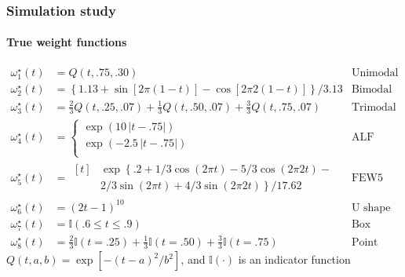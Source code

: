 \documentclass[handout]{snedecorbeamer}
\begin{document}
\begin{frame}%
  \label{frm:simulation-true}
  \frametitle{Simulation study}
  \framesubtitle{True weight functions}

  \vspace{-2ex}
  {\small
    \begin{align*}
      \omega^\star_1(t)
      &=Q(t, .75, .30)
      &\text{Unimodal} \\
      \omega^\star_2(t)
      &=\left\{1.13 + \sin[2\pi(1-t)] - \cos[2\pi2(1-t)]\right\} / 3.13
      &\text{Bimodal} \\
      \omega^\star_3(t)
      &=\frac{2}{3} Q(t, .25, .07)+
        \frac{1}{3} Q(t, .50, .07) +
        \frac{3}{3} Q(t, .75, .07)
      &\text{Trimodal} \\
      \omega^\star_4(t)
      &=
        \begin{cases}
          \exp\left(10\,\lvert t - .75 \rvert\right) \\
          \exp\left(-2.5\,\lvert t - .75 \rvert\right) \\
        \end{cases}
      &\text{ALF} \\
      \omega^\star_5(t)
      &=
        \begin{aligned}[t]
          &\exp\left\{\right.
          .2 +
          1/3 \cos(2\pi t) - 5/3 \cos(2\pi2t) - \\
          &2/3 \sin(2\pi t) + 4/3 \sin(2\pi2t)
          \left.\right\} / 17.62
        \end{aligned}
      &\text{FEW5} \\
      \omega^\star_6(t)
      &= {(2t - 1)}^{10}
      &\text{U shape} \\
      \omega^\star_7(t)
      &=\mathbb{I}(.6\le t \le.9)
      &\text{Box} \\
      \omega^\star_8(t)
      &=\frac{2}{3}\mathbb{I}(t = .25) + \frac{1}{3}\mathbb{I}(t = .50) +
        \frac{3}{3}\mathbb{I}(t = .75)
      &\text{Point weight}
    \end{align*}
    $Q(t, a, b) = \exp\left[-{(t - a)}^2/b^2\right]$, and $\mathbb{I}(\cdot)$
    is an indicator function}
\end{frame}
\end{document}
